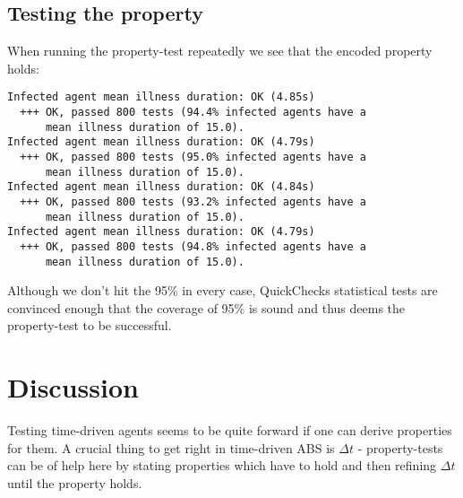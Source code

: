 \subsection{Testing the property}

When running the property-test repeatedly we see that the encoded property holds:

\begin{verbatim}
Infected agent mean illness duration: OK (4.85s)
  +++ OK, passed 800 tests (94.4% infected agents have a 
      mean illness duration of 15.0).
Infected agent mean illness duration: OK (4.79s)
  +++ OK, passed 800 tests (95.0% infected agents have a 
      mean illness duration of 15.0).
Infected agent mean illness duration: OK (4.84s)
  +++ OK, passed 800 tests (93.2% infected agents have a 
      mean illness duration of 15.0).
Infected agent mean illness duration: OK (4.79s)
  +++ OK, passed 800 tests (94.8% infected agents have a 
      mean illness duration of 15.0).
\end{verbatim}

Although we don't hit the 95\% in every case, QuickChecks statistical tests are convinced enough that the coverage of 95\% is sound and thus deems the property-test to be successful.

\section{Discussion}
Testing time-driven agents seems to be quite forward if one can derive properties for them. A crucial thing to get right in time-driven ABS is $\Delta t$ - property-tests can be of help here by stating properties which have to hold and then refining $\Delta t$ until the property holds.